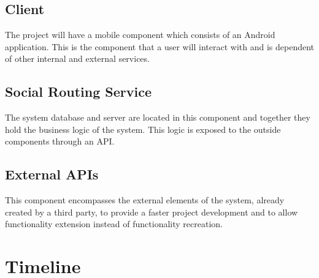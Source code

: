 \documentclass{article}
\begin{document}
        \subsection{Client}  
            The project will have a mobile component which consists of an Android application. 
            This is the component that a user will interact with and is dependent of other internal and external services.
        \subsection{Social Routing Service}
            The system database and server are located in this component and together they hold the business logic of the system.
            This logic is exposed to the outside components through an API.
        \subsection{External APIs}
            This component encompasses the external elements of the system, already created by a third party, to provide a faster project development
            and to allow functionality extension instead of functionality recreation. 
    
    
        \newpage 
        \section{Timeline}    
                \begin{figure}[H]
                \end{figure}
                  
\end{document}
